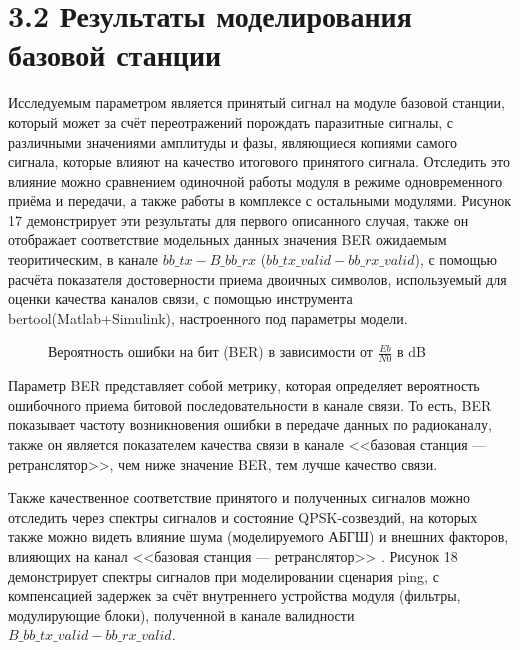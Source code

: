 	\section*{\large{3.2 Результаты моделирования базовой станции}}
\begin{onehalfspace}
    Исследуемым параметром является принятый сигнал на модуле базовой станции, который может за счёт переотражений порождать паразитные сигналы, с различными значениями амплитуды и фазы, являющиеся копиями самого сигнала, которые влияют на качество итогового принятого сигнала. Отследить это влияние можно сравнением одиночной работы модуля в режиме одновременного приёма и передачи, а также работы в комплексе с остальными модулями. Рисунок 17 демонстрирует эти результаты для первого описанного случая, также он отображает соответствие модельных данных значения BER ожидаемым теоритическим, в канале $bb\_tx - B\_bb\_rx$ ($bb\_tx\_valid - bb\_rx\_valid$), с помощью расчёта показателя достоверности приема двоичных символов, используемый для оценки качества каналов связи, с помощью инструмента bertool(Matlab+Simulink), настроенного под параметры модели.
\end{onehalfspace}
	
	\begin{figure}[h]
		\begin{minipage}[h]{0.49\linewidth}
		\end{minipage}
		\hfill
		\begin{minipage}[h]{0.49\linewidth}
		\end{minipage}
		\caption{Вероятность ошибки на бит (BER) в зависимости от $\frac{Eb}{N0}$ в dB}
		\label{fig:model20}
	\end{figure}

\begin{onehalfspace}
Параметр BER представляет собой метрику, которая определяет вероятность ошибочного приема битовой последовательности в канале связи. То есть, BER показывает частоту возникновения ошибки в передаче данных по радиоканалу, также он является показателем качества связи в канале <<базовая станция — ретранслятор>>, чем ниже значение BER, тем лучше качество связи. 


Также качественное соответствие принятого и полученных сигналов можно отследить через спектры сигналов и состояние QPSK-созвездий, на которых также можно видеть влияние шума (моделируемого АБГШ) и внешних факторов, влияющих на канал <<базовая станция — ретранслятор>> . Рисунок 18 демонстрирует спектры сигналов при моделировании сценария ping, с компенсацией задержек за счёт внутреннего устройства модуля (фильтры, модулирующие блоки), полученной в канале валидности $B\_bb\_tx\_valid - bb\_rx\_valid$.
\end{onehalfspace}

